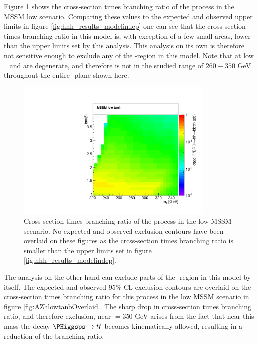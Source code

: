 Figure \ref{fig:Hhhlowtanb} shows the cross-section times branching ratio
of the \Htohhtobbtautau process in the MSSM low \tanb scenario. Comparing these values 
to the expected and observed upper limits in figure \ref{fig:hhh_results_modelindep} one
can see that the cross-section times branching ratio in this model is, with exception of a few small 
areas, lower than the upper limits set by this analysis. This analysis on its own is
therefore not sensitive enough to exclude any of the \mA-\tanb region in this model. Note that
at low \tanb ~ \mA and \mH are degenerate, and therefore \mH is not in the studied range of $260-350$ GeV
throughout the entire \mA-\tanb plane shown here.

\begin{figure}[h!]
\begin{center}
\includegraphics[width=0.85\textwidth]{Hhh/Plots/Hhhlowtbhigh.pdf}
\caption{Cross-section times branching ratio of the \Htohhtobbtautau process
in the low-\tanb MSSM scenario. No expected and observed exclusion contours
have been overlaid on these figures as the cross-section times branching
ratio is smaller than the upper limits set in figure \ref{fig:hhh_results_modelindep}.}
\label{fig:Hhhlowtanb}
\end{center}
\end{figure}

The \AtoZhtolltautau analysis on the other hand can exclude parts of the \mA-\tanb region
in this model by itself. The expected and observed 95\% CL exclusion contours are overlaid 
on the cross-section times branching ratio for this process in the low \tanb MSSM scenario in
figure \ref{fig:AZhlowtanbOverlaid}. The sharp drop in cross-section times branching ratio, and therefore exclusion,
near \mA $ = 350$ GeV arises from the fact that near this mass the decay $\PHiggsps \rightarrow t\bar{t}$ becomes
kinematically allowed, resulting in a reduction of the \AtoZh branching ratio.


